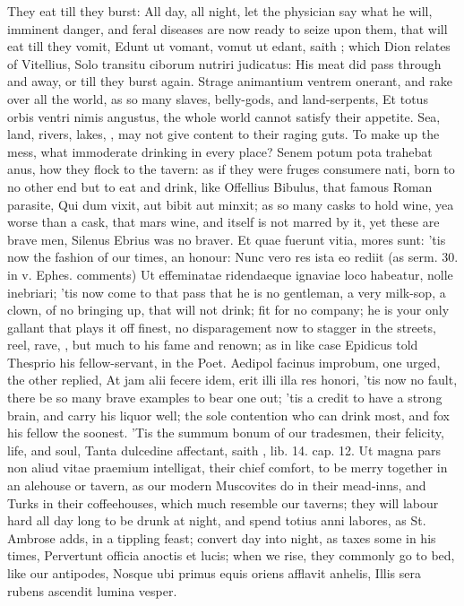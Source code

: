 {{They eat till they burst: All day, all night, let the physician
say what he will, imminent danger, and feral diseases are now ready to
seize upon them, that will eat till they vomit, Edunt ut vomant, vomut
ut edant, saith \Seneca; which Dion relates of Vitellius, Solo transitu
ciborum nutriri judicatus: His meat did pass through and away, or till
they burst again. Strage animantium ventrem onerant, and rake
over all the world, as so many slaves, belly-gods, and
land-serpents, Et totus orbis ventri nimis angustus, the whole world
cannot satisfy their appetite. Sea, land, rivers, lakes, \etc{}, may
not give content to their raging guts. To make up the mess, what
immoderate drinking in every place? Senem potum pota trahebat anus, how
they flock to the tavern: as if they were fruges consumere nati, born
to no other end but to eat and drink, like Offellius Bibulus, that
famous Roman parasite, Qui dum vixit, aut bibit aut minxit; as so many
casks to hold wine, yea worse than a cask, that mars wine, and itself
is not marred by it, yet these are brave men, Silenus Ebrius was no
braver. Et quae fuerunt vitia, mores sunt: 'tis now the fashion of our
times, an honour: Nunc vero res ista eo rediit (as \Chrysostom{} serm. 30.
in v. Ephes. comments) Ut effeminatae ridendaeque ignaviae loco
habeatur, nolle inebriari; 'tis now come to that pass that he is no
gentleman, a very milk-sop, a clown, of no bringing up, that will not
drink; fit for no company; he is your only gallant that plays it off
finest, no disparagement now to stagger in the streets, reel, rave,
\etc{}, but much to his fame and renown; as in like case Epidicus told
Thesprio his fellow-servant, in the Poet. Aedipol facinus
improbum, one urged, the other replied, At jam alii fecere idem, erit
illi illa res honori, 'tis now no fault, there be so many brave
examples to bear one out; 'tis a credit to have a strong brain, and
carry his liquor well; the sole contention who can drink most, and fox
his fellow the soonest. 'Tis the summum bonum of our tradesmen, their
felicity, life, and soul, Tanta dulcedine affectant, saith \Pliny{}, lib.
14. cap. 12. Ut magna pars non aliud vitae praemium intelligat, their
chief comfort, to be merry together in an alehouse or tavern, as our
modern Muscovites do in their mead-inns, and Turks in their
coffeehouses, which much resemble our taverns; they will labour hard
all day long to be drunk at night, and spend totius anni labores, as
St. Ambrose adds, in a tippling feast; convert day into night, as
\Seneca taxes some in his times, Pervertunt officia anoctis et lucis;
when we rise, they commonly go to bed, like our antipodes,
Nosque ubi primus equis oriens afflavit anhelis,
Illis sera rubens ascendit lumina vesper.

}}
